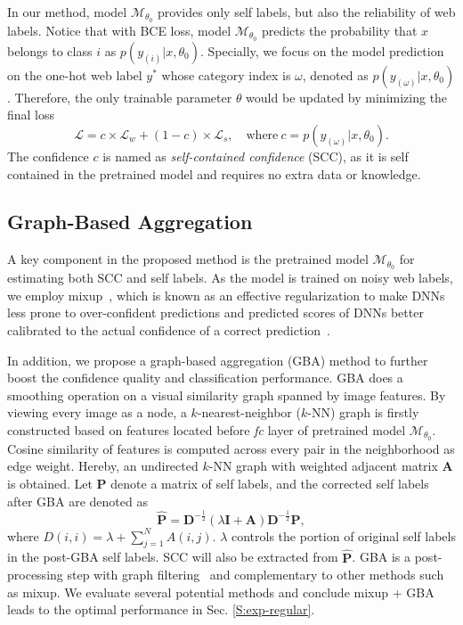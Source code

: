 \documentclass[runningheads]{llncs}
\begin{document}
In our method, model $\mathcal{M}_{\theta_0}$ provides only self labels, but also the reliability of web labels. Notice that with BCE loss, model $\mathcal{M}_{\theta_0}$ predicts the probability that $x$ belongs to class $i$ as $p(y_{(i)}|x,\theta_0)$. Specially, we focus on the model prediction on the one-hot web label $y^*$ whose category index is $\omega$, denoted as $p(y_{(\omega)}|x, \theta_0)$. 
Therefore, the only trainable parameter $\theta$ would be updated by minimizing the final loss 
\begin{equation}
	\mathcal{L}=c\times\mathcal{L}_w+(1-c)\times\mathcal{L}_s, \quad \text{where}~ c=p(y_{(\omega)}|x, \theta_0).
\end{equation}
The confidence $c$ is named as \emph{self-contained confidence} (SCC), as it is self contained in the pretrained model and requires no extra data or knowledge.

\subsection{Graph-Based Aggregation}
\label{S:method-model}
A key component in the proposed method is the pretrained model $\mathcal{M}_{\theta_0}$ for estimating both SCC and self labels. As the model is trained on noisy web labels, we employ
mixup~\cite{zhang2018mixup}, which is known as an effective regularization to make DNNs less prone to over-confident predictions and predicted scores of DNNs better calibrated to the actual confidence of a correct prediction~\cite{thulasidasan2019mixup}.

In addition, we propose a graph-based aggregation (GBA) method to further boost the confidence quality and classification performance. GBA does a smoothing operation on a visual similarity graph spanned by image features. By viewing every image as a node, a $k$-nearest-neighbor ($k$-NN) graph is firstly constructed based on features located before \textit{fc} layer of pretrained model $\mathcal{M}_{\theta_0}$. Cosine similarity of features is computed across every pair in the neighborhood as edge weight. Hereby, an undirected $k$-NN graph with weighted adjacent matrix $\mathbf{A}$ is obtained. Let $\mathbf{P}$ denote a matrix of self labels, and the corrected self labels after GBA are denoted as
\begin{equation}
\mathbf{\hat{P}}=\mathbf{D}^{-\frac{1}{2}}  \left(\lambda\mathbf{I}+\mathbf{A}\right)   \mathbf{D}^{-\frac{1}{2}}\mathbf{P},
\end{equation}
where $D(i,i)=\lambda+\sum_{j=1}^{N}{A(i,j)}$. $\lambda$ controls the portion of original self labels in the post-GBA self labels. SCC will also be extracted from $\mathbf{\hat{P}}$.
GBA is a post-processing step with graph filtering~\cite{kipf2016gcn} and complementary to other methods such as mixup. We evaluate several potential methods and conclude mixup + GBA leads to the optimal performance in Sec. \ref{S:exp-regular}. 
	
\end{document}
